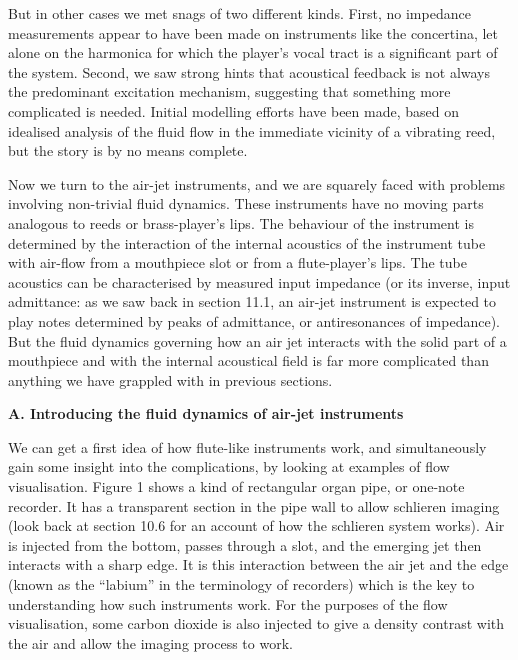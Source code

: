   But in other cases we met snags of two different kinds. First, no impedance 
  measurements appear to have been made on instruments like the concertina, let 
  alone on the harmonica for which the player’s vocal tract is a significant 
  part of the system. Second, we saw strong hints that acoustical feedback is 
  not always the predominant excitation mechanism, suggesting that something 
  more complicated is needed. Initial modelling efforts have been made, based 
  on idealised analysis of the fluid flow in the immediate vicinity of a 
  vibrating reed, but the story is by no means complete. 

  Now we turn to the air-jet instruments, and we are squarely faced with 
  problems involving non-trivial fluid dynamics. These instruments have no 
  moving parts analogous to reeds or brass-player’s lips. The behaviour of the 
  instrument is determined by the interaction of the internal acoustics of the 
  instrument tube with air-flow from a mouthpiece slot or from a flute-player’s 
  lips. The tube acoustics can be characterised by measured input impedance (or 
  its inverse, input admittance: as we saw back in section 11.1, an air-jet 
  instrument is expected to play notes determined by peaks of admittance, or 
  antiresonances of impedance). But the fluid dynamics governing how an air jet 
  interacts with the solid part of a mouthpiece and with the internal 
  acoustical field is far more complicated than anything we have grappled with 
  in previous sections. 

  \textbf{A. Introducing the fluid dynamics of air-jet instruments} 

  We can get a first idea of how flute-like instruments work, and 
  simultaneously gain some insight into the complications, by looking at 
  examples of flow visualisation. Figure 1 shows a kind of rectangular organ 
  pipe, or one-note recorder. It has a transparent section in the pipe wall to 
  allow schlieren imaging (look back at section 10.6 for an account of how the 
  schlieren system works). Air is injected from the bottom, passes through a 
  slot, and the emerging jet then interacts with a sharp edge. It is this 
  interaction between the air jet and the edge (known as the ``labium'' in the 
  terminology of recorders) which is the key to understanding how such 
  instruments work. For the purposes of the flow visualisation, some carbon 
  dioxide is also injected to give a density contrast with the air and allow 
  the imaging process to work. 


